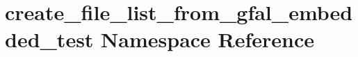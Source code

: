 \hypertarget{namespacecreate__file__list__from__gfal__embedded__test}{
\section{create\_\-file\_\-list\_\-from\_\-gfal\_\-embedded\_\-test Namespace Reference}
\label{namespacecreate__file__list__from__gfal__embedded__test}
}
